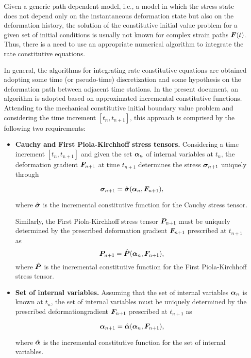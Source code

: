 Given a generic path-dependent model, i.e., a model in which the stress state does not depend only on the instantaneous deformation state but also on the deformation history, the solution of the constitutive initial value problem for a given set of initial conditions is usually not known for complex strain paths $\bm{F}(t)$.
Thus, there is a need to use an appropriate numerical algorithm to integrate the rate constitutive equations.

In general, the algorithms for integrating rate constitutive equations are obtained adopting some time (or pseudo-time) discretization and some hypothesis on the deformation path between adjacent time stations.
In the present document, an algorithm is adopted based on approximated incremental constitutive functions.
Attending to the mechanical constitutive initial boundary value problem and considering the time increment $[t_n, t_{n+1}]$, this approach is comprised by the following two requirements:
\begin{itemize}
    \item \textbf{Cauchy and First Piola-Kirchhoff stress tensors.}   Considering a time increment $[t_n, t_{n+1}]$ and given the set $\bm{\alpha}_n$ of internal variables at $t_n$, the deformation gradient $\bm{F}_{n+1}$ at time $t_{n+1}$ determines the stress $\bm{\sigma}_{n+1}$ uniquely through
    \begin{highlight}
        \begin{equation}
            \bm{\sigma}_{n+1} = \hat{\bm{\sigma}}(\bm{\alpha}_n, \bm{F}_{n+1}), \label{eq:incremental_stress}
        \end{equation}
    \end{highlight}
    where $\hat{\bm{\sigma}}$ is the incremental constitutive function for the Cauchy stress tensor.

    Similarly, the First Piola-Kirchhoff stress tensor $\bm{P}_{n+1}$ must be uniquely determined by the prescribed deformation gradient $\bm{F}_{n+1}$ prescribed at $t_{n+1}$ as
    \begin{equation}
        \bm{P}_{n+1} = \hat{\bm{P}}(\bm{\alpha}_n, \bm{F}_{n+1}),
    \end{equation}
    where $\hat{\bm{P}}$ is the incremental constitutive function for the First Piola-Kirchhoff stress tensor.
    \item \textbf{Set of internal variables.} Assuming that the set of internal variables $\bm{\alpha}_n$ is known at $t_n$, the set of internal variables must be uniquely determined by the prescribed deformationgradient $\bm{F}_{n+1}$ prescribed at $t_{n+1}$ as
    \begin{highlight}
        \begin{equation}
             \bm{\alpha}_{n+1} =\hat{\bm{\alpha}}(\bm{\alpha}_n, \bm{F}_{n+1}), \label{eq:incremental_flux}
        \end{equation}
    \end{highlight}
    where $\hat{\bm{\alpha}}$ is the incremental constitutive function for the set of internal variables.
\end{itemize}

